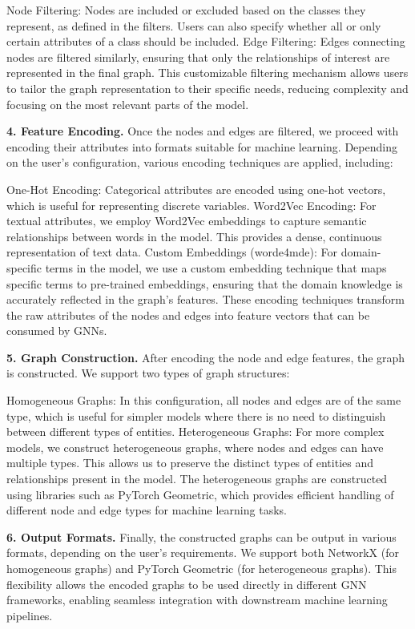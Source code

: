 \documentclass[journal,article,submit,moreauthors,technologies]{Definitions/mdpi}
\begin{document}
Node Filtering: Nodes are included or excluded based on the classes they represent, as defined in the filters. Users can also specify whether all or only certain attributes of a class should be included.
Edge Filtering: Edges connecting nodes are filtered similarly, ensuring that only the relationships of interest are represented in the final graph.
This customizable filtering mechanism allows users to tailor the graph representation to their specific needs, reducing complexity and focusing on the most relevant parts of the model.

\textbf{4. Feature Encoding.}
Once the nodes and edges are filtered, we proceed with encoding their attributes into formats suitable for machine learning. Depending on the user's configuration, various encoding techniques are applied, including:

One-Hot Encoding: Categorical attributes are encoded using one-hot vectors, which is useful for representing discrete variables.
Word2Vec Encoding: For textual attributes, we employ Word2Vec embeddings to capture semantic relationships between words in the model. This provides a dense, continuous representation of text data.
Custom Embeddings (worde4mde): For domain-specific terms in the model, we use a custom embedding technique that maps specific terms to pre-trained embeddings, ensuring that the domain knowledge is accurately reflected in the graph's features.
These encoding techniques transform the raw attributes of the nodes and edges into feature vectors that can be consumed by GNNs.

\textbf{5. Graph Construction.}
After encoding the node and edge features, the graph is constructed. We support two types of graph structures:

Homogeneous Graphs: In this configuration, all nodes and edges are of the same type, which is useful for simpler models where there is no need to distinguish between different types of entities.
Heterogeneous Graphs: For more complex models, we construct heterogeneous graphs, where nodes and edges can have multiple types. This allows us to preserve the distinct types of entities and relationships present in the model. The heterogeneous graphs are constructed using libraries such as PyTorch Geometric, which provides efficient handling of different node and edge types for machine learning tasks.

\textbf{6. Output Formats.}
Finally, the constructed graphs can be output in various formats, depending on the user's requirements. We support both NetworkX (for homogeneous graphs) and PyTorch Geometric (for heterogeneous graphs). This flexibility allows the encoded graphs to be used directly in different GNN frameworks, enabling seamless integration with downstream machine learning pipelines.
\end{document}
